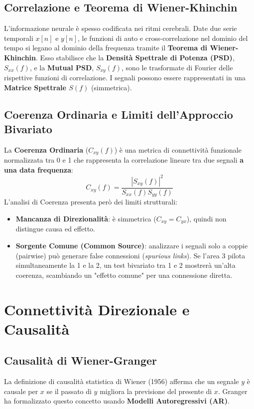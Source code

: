 \subsection{Correlazione e Teorema di Wiener-Khinchin}
L'informazione neurale è spesso codificata nei ritmi cerebrali. Date due serie temporali $x[n]$ e $y[n]$, le funzioni di auto e cross-correlazione nel dominio del tempo si legano al dominio della frequenza tramite il \textbf{Teorema di Wiener-Khinchin}. Esso stabilisce che la \textbf{Densità Spettrale di Potenza (PSD)}, $S_{xx}(f)$, e la \textbf{Mutual PSD}, $S_{xy}(f)$, sono le trasformate di Fourier delle rispettive funzioni di correlazione.
I segnali possono essere rappresentati in una \textbf{Matrice Spettrale $S(f)$} (simmetrica).

\subsection{Coerenza Ordinaria e Limiti dell'Approccio Bivariato}
La \textbf{Coerenza Ordinaria} ($C_{xy}(f)$) è una metrica di connettività funzionale normalizzata tra 0 e 1 che rappresenta la correlazione lineare tra due segnali \textbf{a una data frequenza}:
\begin{equation}
C_{xy}(f) = \frac{|S_{xy}(f)|^2}{S_{xx}(f)S_{yy}(f)}
\end{equation}
L'analisi di Coerenza presenta però dei limiti strutturali:
\begin{itemize}
    \item \textbf{Mancanza di Direzionalità}: è simmetrica ($C_{xy} = C_{yx}$), quindi non distingue causa ed effetto.
    \item \textbf{Sorgente Comune (Common Source)}: analizzare i segnali solo a coppie (pairwise) può generare false connessioni (\textit{spurious links}). Se l'area 3 pilota simultaneamente la 1 e la 2, un test bivariato tra 1 e 2 mostrerà un'alta coerenza, scambiando un "effetto comune" per una connessione diretta.
\end{itemize}

\section{Connettività Direzionale e Causalità}

\subsection{Causalità di Wiener-Granger}
La definizione di causalità statistica di Wiener (1956) afferma che un segnale $y$ è causale per $x$ se il passato di $y$ migliora la previsione del presente di $x$. Granger ha formalizzato questo concetto usando \textbf{Modelli Autoregressivi (AR)}.

